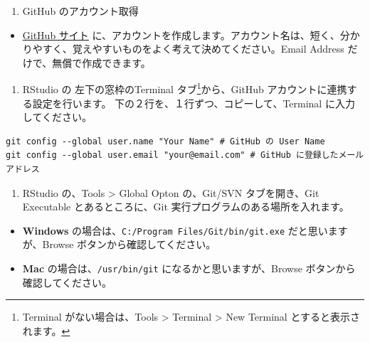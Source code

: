 \documentclass[
  xelatex, ja=standard]{bxjsbook}
\providecommand{\tightlist}{%
  \setlength{\itemsep}{0pt}\setlength{\parskip}{0pt}}
\theoremstyle{definition}
\theoremstyle{definition}
\theoremstyle{definition}
\theoremstyle{definition}
\theoremstyle{remark}
\begin{document}
\begin{enumerate}
\def\labelenumi{\arabic{enumi}.}
\setcounter{enumi}{1}
\tightlist
\item
  GitHub のアカウント取得
\end{enumerate}

\begin{itemize}
\tightlist
\item
  \href{https://github.com}{GitHub サイト} に、アカウントを作成します。アカウント名は、短く、分かりやすく、覚えやすいものをよく考えて決めてください。Email Address だけで、無償で作成できます。
\end{itemize}

\begin{enumerate}
\def\labelenumi{\arabic{enumi}.}
\setcounter{enumi}{2}
\tightlist
\item
  RStudio の 左下の窓枠のTerminal タブ\footnote{Terminal がない場合は、Tools \textgreater{} Terminal \textgreater{} New Terminal とすると表示されます。}から、GitHub アカウントに連携する設定を行います。 下の２行を、１行ずつ、コピーして、Terminal に入力してください。
\end{enumerate}

\begin{verbatim}
git config --global user.name "Your Name" # GitHub の User Name
git config --global user.email "your@email.com" # GitHub に登録したメールアドレス
\end{verbatim}

\begin{enumerate}
\def\labelenumi{\arabic{enumi}.}
\setcounter{enumi}{3}
\tightlist
\item
  RStudio の、Tools \textgreater{} Global Opton の、Git/SVN タブを開き、Git Executable とあるところに、Git 実行プログラムのある場所を入れます。
\end{enumerate}

\begin{itemize}
\tightlist
\item
  \textbf{Windows} の場合は、\texttt{C:/Program\ Files/Git/bin/git.exe} だと思いますが、Browse ボタンから確認してください。
\item
  \textbf{Mac} の場合は、\texttt{/usr/bin/git} になるかと思いますが、Browse ボタンから確認してください。
\end{itemize}
\end{document}
